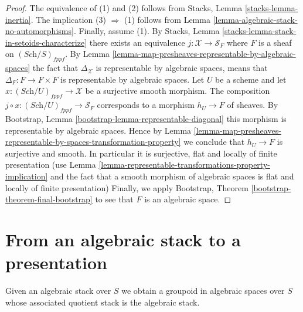 \begin{proof}
The equivalence of (1) and (2) follows from
Stacks, Lemma \ref{stacks-lemma-inertia}.
The implication (3) $\Rightarrow$ (1) follows from
Lemma \ref{lemma-algebraic-stack-no-automorphisms}.
Finally, assume (1). By
Stacks, Lemma \ref{stacks-lemma-stack-in-setoids-characterize}
there exists an equivalence $j : \mathcal{X} \to \mathcal{S}_F$
where $F$ is a sheaf on $(\textit{Sch}/S)_{fppf}$.  By
Lemma \ref{lemma-map-presheaves-representable-by-algebraic-spaces}
the fact that $\Delta_\mathcal{X}$ is representable by algebraic
spaces, means that $\Delta_F : F \to F \times F$
is representable by algebraic spaces.
Let $U$ be a scheme and let $x : (\textit{Sch}/U)_{fppf} \to \mathcal{X}$
be a surjective smooth morphism. The composition
$j \circ x : (\textit{Sch}/U)_{fppf} \to \mathcal{S}_F$
corresponds to a morphism $h_U \to F$ of sheaves. By
Bootstrap, Lemma \ref{bootstrap-lemma-representable-diagonal}
this morphism is representable by algebraic spaces.
Hence by
Lemma
\ref{lemma-map-presheaves-representable-by-spaces-transformation-property}
we conclude that $h_U \to F$ is surjective and smooth.
In particular it is surjective, flat and locally of finite presentation
(use
Lemma \ref{lemma-representable-transformations-property-implication}
and the fact that a smooth morphism of algebraic spaces is flat and
locally of finite presentation)
Finally, we apply
Bootstrap, Theorem \ref{bootstrap-theorem-final-bootstrap}
to see that $F$ is an algebraic space.
\end{proof}







\section{From an algebraic stack to a presentation}
\label{section-stack-to-presentation}

\noindent
Given an algebraic stack over $S$ we obtain a groupoid in algebraic spaces
over $S$ whose associated quotient stack is the algebraic stack.

